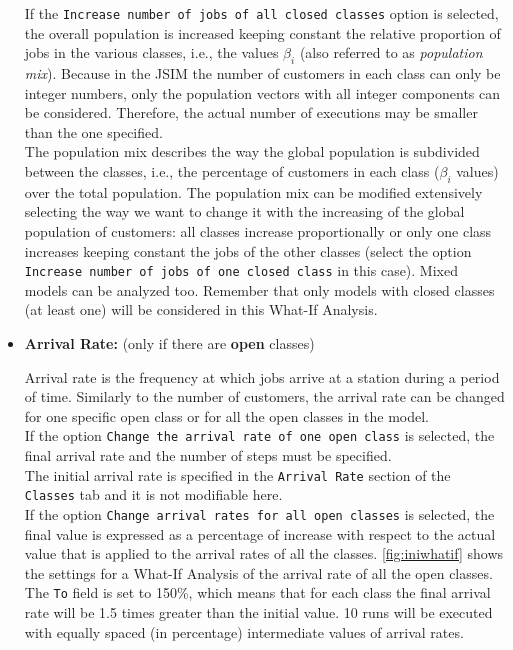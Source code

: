 \begin{itemize}
If the \texttt{Increase number of jobs of all closed classes}
option is selected, the overall population is increased keeping
constant the relative proportion of jobs in the various classes,
i.e., the values $\beta_i$ (also referred to as \emph{population
mix}). Because in the JSIM the number of customers in each class
can only be integer numbers, only the population vectors with all
integer components can be considered. Therefore, the actual number
of executions may be
smaller than the one specified.\\
The population mix describes the way the global population is
subdivided between the classes, i.e., the percentage of customers
in each class ($\beta_i$ values) over the total population. The
population mix can be modified extensively selecting the way we
want to change it with the increasing of the global population of
customers: all classes increase proportionally or only one class
increases keeping constant the jobs of the other classes (select
the option \texttt{Increase number of jobs of one closed class} in
this case). Mixed models can be analyzed too. Remember that only
models with closed classes (at least one) will be considered in
this What-If Analysis.

\item \textbf{Arrival Rate:} (only if there are \textbf{open}
classes)

Arrival rate is the frequency at which jobs arrive at a station
during a period of time. Similarly to the number of customers, the
arrival rate can be changed for one specific open class or for all
the open classes in the model.\\ If the option \texttt{Change the
arrival rate of one open class} is selected, the final arrival
rate and the number of steps must be specified.\\
The initial arrival rate is specified in the \texttt{Arrival Rate}
section of the \texttt{Classes} tab and it is not modifiable
here.\\
If the option \texttt{Change arrival rates for all open classes}
is selected, the final value is expressed as a percentage of
increase with respect to the actual value that is applied to the
arrival rates of all the classes.
\autoref{fig:iniwhatif} shows the settings for a What-If
Analysis of the arrival rate of all the open classes. The
\texttt{To} field is set to 150\%, which means that for each class
the final arrival rate will be 1.5 times greater than the initial
value. 10 runs will be executed with equally spaced (in
percentage) intermediate values of arrival rates.


\end{itemize}
